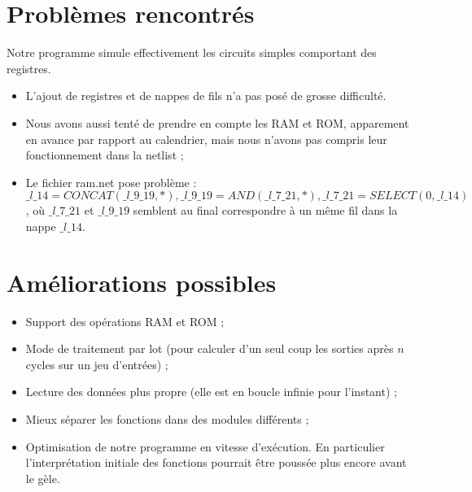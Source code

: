\documentclass[a4paper]{article}
\begin{document}
\section{Problèmes rencontrés}

Notre programme simule effectivement les circuits
simples comportant des registres.
\begin{itemize}
    \item L'ajout de registres et de nappes de fils n'a pas posé de
grosse difficulté.
    \item Nous avons aussi tenté de prendre en compte les RAM et ROM,
apparement en avance par rapport au calendrier, mais nous n'avons pas
compris leur fonctionnement dans la netlist ;
    \item Le fichier ram.net pose problème : $\_l\_14 =
CONCAT(\_l\_9\_19,*), \_l\_9\_19 = AND(\_l\_7\_21,*), \_l\_7\_21 =
SELECT(0,\_l\_14)$, où $\_l\_7\_21$ et $\_l\_9\_19$ semblent au final
correspondre à un même fil dans la nappe $\_l\_14$.
\end{itemize}

\section{Améliorations possibles}

\begin{itemize}
    \item Support des opérations RAM et ROM ;
    \item Mode de traitement par lot (pour calculer d'un seul coup les sorties après $n$ cycles sur un jeu d'entrées) ;
    \item Lecture des données plus propre (elle est en boucle
infinie pour l'instant) ;
    \item Mieux séparer les fonctions dans des modules différents ;
    \item Optimisation de notre programme en vitesse d'exécution. En particulier l'interprétation initiale des fonctions pourrait être poussée plus encore avant le gèle.
\end{itemize}

\end{document}
